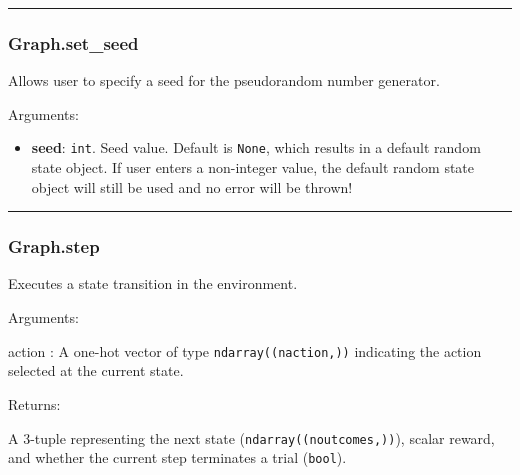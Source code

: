 \begin{center}\rule{0.5\linewidth}{\linethickness}\end{center}

\subsubsection{Graph.set\_seed}\label{graph.set_seed}

\begin{Shaded}
\begin{Highlighting}[]
\OperatorTok{=}\NormalTok{)}
\end{Highlighting}
\end{Shaded}

Allows user to specify a seed for the pseudorandom number generator.

Arguments:

\begin{itemize}
\tightlist
\item
  \textbf{seed}: \texttt{int}. Seed value. Default is \texttt{None},
  which results in a default random state object. If user enters a
  non-integer value, the default random state object will still be used
  and no error will be thrown!
\end{itemize}

\begin{center}\rule{0.5\linewidth}{\linethickness}\end{center}

\subsubsection{Graph.step}\label{graph.step}

\begin{Shaded}
\begin{Highlighting}[]
\end{Highlighting}
\end{Shaded}

Executes a state transition in the environment.

Arguments:

action : A one-hot vector of type \texttt{ndarray((naction,))}
indicating the action selected at the current state.

Returns:

A 3-tuple representing the next state (\texttt{ndarray((noutcomes,))}),
scalar reward, and whether the current step terminates a trial
(\texttt{bool}).


